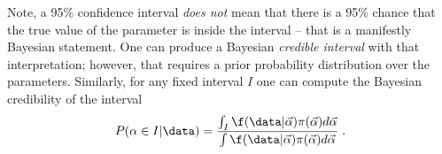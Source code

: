 Note, a 95\% confidence interval \textit{does not} mean that there is a 95\% chance that the true value of the parameter is inside the interval -- that is a manifestly Bayesian statement.  One can produce a Bayesian \textit{credible interval} with that interpretation; however, that requires a prior probability distribution over the parameters.  Similarly, for any fixed interval $I$ one can compute the Bayesian credibility of the interval 
\begin{equation}
\label{eqn:credible}
P(\alpha\in I | \data) = \frac{ \int_{I}  \f(\data | \vec\alpha) \pi(\vec\alpha) d\vec\alpha }{\int \f(\data | \vec\alpha) \pi(\vec\alpha) d\vec\alpha} \;.
\end{equation}

